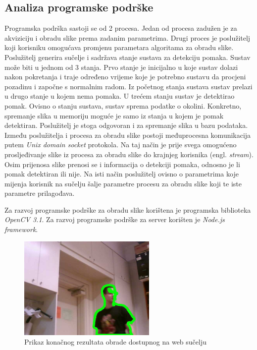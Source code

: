 \documentclass[a4paper,twocolumn]{article}
\begin{document}
\subsection{Analiza programske podrške}
Programska podrška sastoji se od 2 procesa. Jedan od procesa zadužen je
za akviziciju i obradu slike prema zadanim parametrima. Drugi proces je
poslužitelj koji korisniku omogućava promjenu parametara algoritama za obradu
slike. Poslužitelj generira sučelje i sadržava stanje sustava za detekciju
pomaka. Sustav može biti u jednom od 3 stanja. Prvo stanje je inicijalno u koje
sustav dolazi nakon pokretanja i traje određeno vrijeme koje je potrebno sustavu
da procjeni pozadinu i započne s normalnim radom. Iz početnog stanja sustava
sustav prelazi u drugo stanje u kojem nema pomaka. U trećem stanju sustav je
detektirao pomak. Ovisno o stanju sustava, sustav sprema podatke o okolini.
Konkretno, spremanje slika u memoriju moguće je samo iz stanja u kojem je
pomak detektiran. Poslužitelj je stoga odgovoran i za spremanje slika u bazu
podataka. Između poslužitelja i procesa za obradu slike postoji međuprocesna
komunikacija putem \textit{Unix domain socket} protokola. Na taj način je
prije svega omogućeno prosljeđivanje slike iz procesa za obradu slike do
krajnjeg korisnika (engl. \textit{stream}). Osim prijenosa slike prenosi se
i informacija o detekciji pomaka, odnosno je li pomak detektiran ili nije.
Na isti način poslužitelj ovisno o parametrima koje mijenja korisnik na sučelju
šalje parametre procesu za obradu slike koji te iste parametre prilagođava.

Za razvoj programske podrške za obradu slike korištena je programska biblioteka
\textit{OpenCV 3.1}. Za razvoj programske podrške za server korišten je
\textit{Node.js framework}.

\begin{figure}[hp!]
\begin{center}
\includegraphics[height=5cm]{interface.jpeg}
\caption{Prikaz konačnog rezultata obrade dostupnog na web sučelju}
\end{center}
\end{figure}
\end{document}
